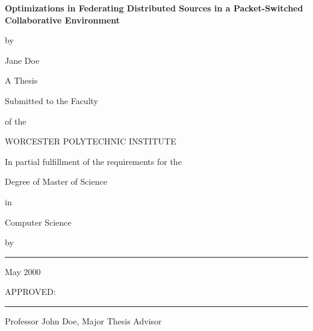 \documentclass[12pt]{report}
\begin{document}
%


%
\newcommand{\brk}{\vspace*{0.18in}}

\thispagestyle{empty}

\begin{center}

\brk


   {\large 
	\textbf{
	Optimizations in Federating Distributed Sources in a
	Packet-Switched  Collaborative Environment
	}
   }


\brk
by

\brk
Jane Doe


\brk\brk
A Thesis

\brk
Submitted to the Faculty

\brk
of the

\brk
WORCESTER POLYTECHNIC INSTITUTE

\brk
In partial fulfillment of the requirements for the

\brk
Degree of Master of Science

\brk
in

\brk
Computer Science

\brk
by

\brk\brk
\rule{3in}{1.2pt}

\brk
May 2000

\end{center}


\vfill
APPROVED:

\vspace{0.5in}
\rule{3in}{0.8pt}

Professor John Doe, Major Thesis Advisor
\end{document}
